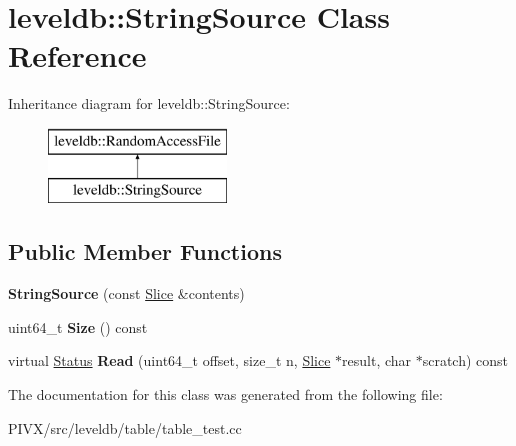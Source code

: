 \hypertarget{classleveldb_1_1_string_source}{}\section{leveldb\+:\+:String\+Source Class Reference}
\label{classleveldb_1_1_string_source}
Inheritance diagram for leveldb\+:\+:String\+Source\+:\begin{figure}[H]
\begin{center}
\leavevmode
\includegraphics[height=2.000000cm]{classleveldb_1_1_string_source}
\end{center}
\end{figure}
\subsection*{Public Member Functions}
\begin{DoxyCompactItemize}
\item 
\mbox{\label{classleveldb_1_1_string_source_a4f85ccda6f37775d790834de05284fda}} 
{\bfseries String\+Source} (const \mbox{\hyperlink{classleveldb_1_1_slice}{Slice}} \&contents)
\item 
\mbox{\label{classleveldb_1_1_string_source_ab301b92b1f4241716f6f4de39ec37c7d}} 
uint64\+\_\+t {\bfseries Size} () const
\item 
\mbox{\label{classleveldb_1_1_string_source_a1559264c0313ee764943b8995d26ddb8}} 
virtual \mbox{\hyperlink{classleveldb_1_1_status}{Status}} {\bfseries Read} (uint64\+\_\+t offset, size\+\_\+t n, \mbox{\hyperlink{classleveldb_1_1_slice}{Slice}} $\ast$result, char $\ast$scratch) const
\end{DoxyCompactItemize}


The documentation for this class was generated from the following file\+:\begin{DoxyCompactItemize}
\item 
P\+I\+V\+X/src/leveldb/table/table\+\_\+test.\+cc\end{DoxyCompactItemize}
